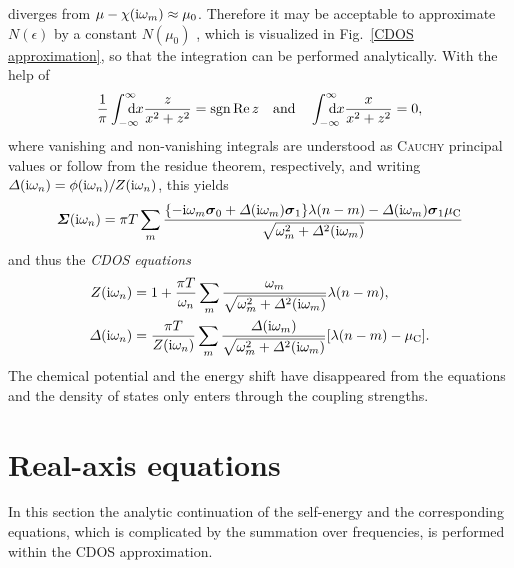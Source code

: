 diverges from $\mu - \chi(\mathrm i \omega_m) \approx \mu_0$. Therefore it may be
acceptable to approximate $N(\epsilon)$ by a constant $N(\mu_0)$ \cites [below
Eq.~26]{Allen76} [17]{AllenMitrovic82} [Section~II.B]{MargineGiustino13}, which
is visualized in Fig.~\ref{CDOS approximation}, so that the integration can be
performed analytically. With the help of
%
\begin{equation} \label{integrals}
    \frac 1 \pi \int \from{-\infty} \till \infty \D x \frac z {x^2 + z^2}
    = \sgn \Re z
    \quad \text{and} \quad
    \int \from{-\infty} \till \infty \D x \frac x {x^2 + z^2} = 0,
\end{equation}
%
where vanishing and non-vanishing integrals are understood as \textsc{Cauchy}
principal values or follow from the residue theorem, respectively, and writing
$\varDelta(\mathrm i \omega_n) = \phi(\mathrm i \omega_n) / Z(\mathrm i \omega_n)$, this yields
%
\begin{equation*}
    \boldsymbol {\varSigma}(\mathrm i \omega_n)
    = \pi T \sum_m \frac{ \{
        - \mathrm i \omega_m \boldsymbol \sigma_0 + \varDelta(\mathrm i \omega_m) \boldsymbol \sigma_1
        \} \lambda(n - m)
        - \varDelta(\mathrm i \omega_m) \boldsymbol \sigma_1 \mu \sb{\text{C}} }
        { \sqrt{\omega_m^2 + \varDelta^2(\mathrm i \omega_m)} }
\end{equation*}
%
and thus the \emph{CDOS  equations}
%
\begin{subequations} \label{CDOS Eliashberg equations}
    \begin{align}
        Z(\mathrm i \omega_n) &= 1 + \frac{\pi T}{\omega_n} \sum_m
        \frac{\omega_m}{\sqrt{\omega_m^2 + \varDelta^2(\mathrm i \omega_m)}}
        \lambda(n - m),
        \\
        \varDelta(\mathrm i \omega_n) &= \frac{\pi T}{Z(\mathrm i \omega_n)} \sum_m
        \frac{\varDelta(\mathrm i \omega_m)}{\sqrt{\omega_m^2 + \varDelta^2(\mathrm i \omega_m)}}
        [\lambda(n - m) - \mu \sb{\text{C}}].
    \end{align}
\end{subequations}
%
The chemical potential and the energy shift have disappeared from the equations
and the density of states only enters through the coupling strengths.

\section{Real-axis equations}

In this section the analytic continuation of the self-energy and the
corresponding  equations, which is complicated by the summation
over  frequencies, is performed within the CDOS approximation.

